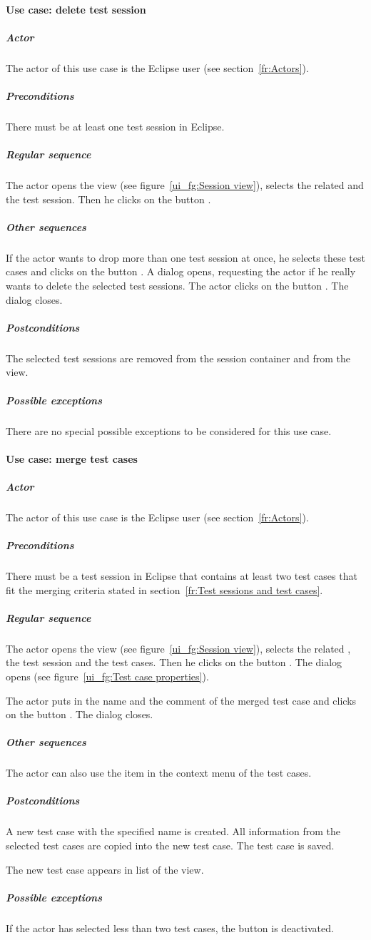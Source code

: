 \paragraph{Use case: delete test session}
\subparagraph{Actor}
The actor of this use case is the Eclipse user (see section~\ref{fr:Actors}).
\subparagraph{Preconditions}
There must be at least one test session in Eclipse.
\subparagraph{Regular sequence}
The actor opens the  view (see figure~\ref{ui_fg:Session view}), selects the related  and the test session. Then he clicks on the button .
\subparagraph{Other sequences}
If the actor wants to drop more than one test session at once, he selects these test cases and clicks on the button . A dialog opens, requesting the actor if he really wants to delete the selected test sessions. The actor clicks on the button . The dialog closes.
\subparagraph{Postconditions}
The selected test sessions are removed from the session container and from the  view.
\subparagraph{Possible exceptions}
There are no special possible exceptions to be considered for this use case.

\paragraph{Use case: merge test cases}
\subparagraph{Actor}
The actor of this use case is the Eclipse user (see section~\ref{fr:Actors}).
\subparagraph{Preconditions}
There must be a test session in Eclipse that contains at least two test cases that fit the merging criteria stated in section~\ref{fr:Test sessions and test cases}.
\subparagraph{Regular sequence}
The actor opens the  view (see figure~\ref{ui_fg:Session view}), selects the related , the test session and the test cases. Then he clicks on the button . The dialog  opens (see figure~\ref{ui_fg:Test case properties}).
\par
The actor puts in the name and the comment of the merged test case and clicks on the button . The dialog closes.
\subparagraph{Other sequences}
The actor can also use the item  in the context menu of the test cases.
\subparagraph{Postconditions}
A new test case with the specified name is created. All information from the selected test cases are copied into the new test case. The test case is saved.
\par
The new test case appears in list of the  view.
\subparagraph{Possible exceptions}
If the actor has selected less than two test cases, the button  is deactivated.

